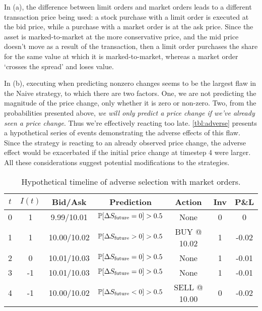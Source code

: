 In (a), the difference between limit orders and market orders leads to a different transaction price being used: a stock purchase with a limit order is executed at the bid price, while a purchase with a market order is at the ask price. Since the asset is marked-to-market at the more conservative price, and the mid price doesn't move as a result of the transaction, then a limit order purchases the share for the same value at which it is marked-to-market, whereas a market order `crosses the spread' and loses value.

In (b), executing when predicting nonzero changes seems to be the largest flaw in the Naive strategy, to which there are two factors. One, we are not predicting the magnitude of the price change, only whether it is zero or non-zero. Two, from the probabilities presented above, \emph{we will only predict a price change if we've already seen a price change}. Thus we're effectively reacting too late. \autoref{tbl:adverse} presents a hypothetical series of events demonstrating the adverse effects of this flaw. Since the strategy is reacting to an already observed price change, the adverse effect would be exacerbated if the initial price change at timestep 4 were larger. All these considerations suggest potential modifications to the strategies.

\begin{table}%
\centering%
%
\caption[Hypothetical timeline of adverse selection with market orders]{Hypothetical timeline of adverse selection with market orders.}\label{tbl:adverse}%
\begin{tabular}{@{} *{7}{c} @{}}%
\toprule
$t$ & $I(t)$ & Bid/Ask & Prediction & Action & Inv & P\&L \\
\midrule
0 & 1 & \hphantom{1}9.99/10.01 & $\P[\Delta S_\text{future} = 0] > 0.5$ & None & 0 & 0 \\
1 & 1 & 10.00/10.02 & $\P[\Delta S_\text{future} > 0] > 0.5$ & BUY @ 10.02 & 1 & -0.02 \\
2 & 0 & 10.01/10.03 & $\P[\Delta S_\text{future} = 0] > 0.5$ & None & 1 & -0.01 \\
3 & -1 & 10.01/10.03 & $\P[\Delta S_\text{future} = 0] > 0.5$ & None & 1 & -0.01 \\
4 & -1 & 10.00/10.02 & $\P[\Delta S_\text{future} < 0] > 0.5$ & SELL @ 10.00 & 0 & -0.02 \\
\bottomrule
\end{tabular}%
\end{table}%